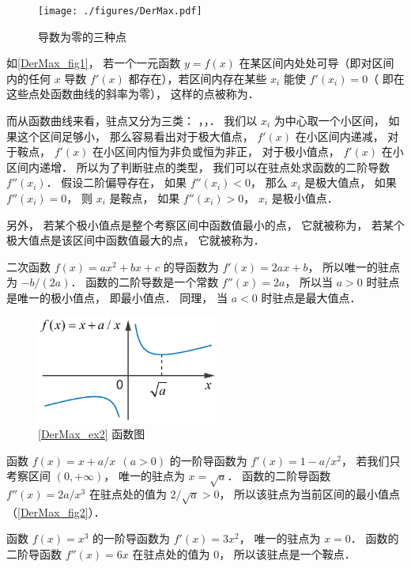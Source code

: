 
\begin{figure}[ht]
\vskip-10pt
\centering
\texttt{[image: ./figures/DerMax.pdf]}
\caption{导数为零的三种点}\label{DerMax_fig1}
\end{figure}

如\autoref{DerMax_fig1}， 若一个一元函数 $y = f(x)$ 在某区间内处处可导（即对区间内的任何 $x$ 导数 $f'(x)$ 都存在），若区间内存在某些 $x_i$ 能使 $f'(x_i) = 0$（ 即在这些点处函数曲线的斜率为零）， 这样的点被称为．

而从函数曲线来看，驻点又分为三类： ，，． 我们以 $x_i$ 为中心取一个小区间， 如果这个区间足够小， 那么容易看出对于极大值点， $f'(x)$ 在小区间内递减， 对于鞍点， $f'(x)$ 在小区间内恒为非负或恒为非正， 对于极小值点， $f'(x)$ 在小区间内递增． 所以为了判断驻点的类型， 我们可以在驻点处求函数的二阶导数 $f''(x_i)$． 假设二阶偏导存在， 如果 $f''(x_i) < 0$， 那么 $x_i$ 是极大值点， 如果 $f''(x_i) = 0$， 则 $x_i$  是鞍点， 如果 $f''(x_i) > 0$， $x_i$ 是极小值点．

另外， 若某个极小值点是整个考察区间中函数值最小的点， 它就被称为， 若某个极大值点是该区间中函数值最大的点， 它就被称为．

\begin{exam}{}
二次函数 $f(x) = ax^2 + bx + c$ 的导函数为 $f'(x) = 2ax + b$， 所以唯一的驻点为 $-b/(2a)$． 函数的二阶导数是一个常数 $f''(x) = 2a$， 所以当 $a > 0$ 时驻点是唯一的极小值点， 即最小值点． 同理， 当 $a < 0$ 时驻点是最大值点．
\end{exam}

\begin{figure}[ht]
\centering
\includegraphics[width=6cm]{./figures/DerMax2.pdf}
\caption{\autoref{DerMax_ex2} 函数图} \label{DerMax_fig2}
\end{figure}

\begin{exam}{}\label{DerMax_ex2}
函数 $f(x) = x+a/x \ \ (a > 0)$ 的一阶导函数为 $f'(x) = 1 - a/x^2$， 若我们只考察区间 $(0, +\infty)$， 唯一的驻点为 $x = \sqrt{a}$． 函数的二阶导函数 $f''(x) = 2a/x^3$ 在驻点处的值为 $2/\sqrt{a} > 0$， 所以该驻点为当前区间的最小值点（\autoref{DerMax_fig2}）．
\end{exam}

\begin{exam}{}\label{DerMax_ex3}
函数 $f(x) = x^3$ 的一阶导函数为 $f'(x) = 3x^2$， 唯一的驻点为 $x = 0$． 函数的二阶导函数 $f''(x) = 6x$ 在驻点处的值为 $0$， 所以该驻点是一个鞍点．
\end{exam}











